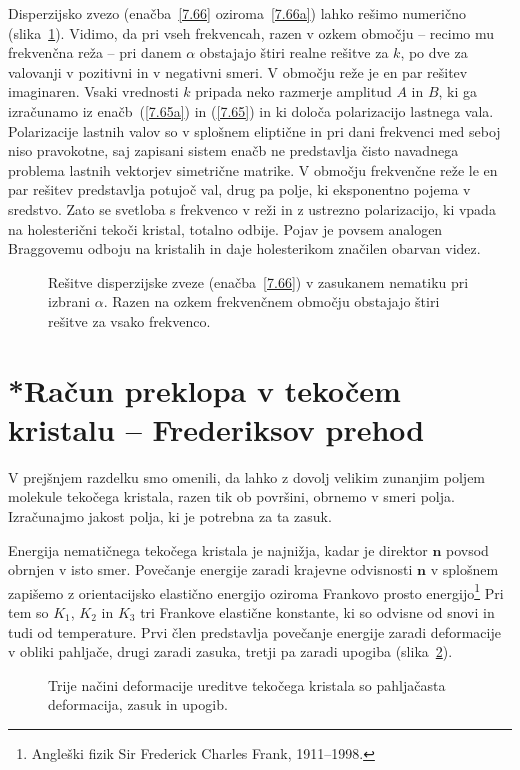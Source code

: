 \begin{remark}
Disperzijsko zvezo (enačba~\ref{7.66} oziroma~\ref{7.66a}) 
lahko rešimo numerično (slika~\ref{gap}). Vidimo, da pri 
vseh frekvencah, razen v ozkem območju -- recimo mu frekvenčna reža --
pri danem $\alpha$ obstajajo štiri realne rešitve za $k$, 
po dve za valovanji v pozitivni in v negativni smeri.
V območju reže je en par rešitev imaginaren. Vsaki vrednosti $k$
pripada neko razmerje amplitud $A$ in $B$, ki ga izračunamo
iz enačb~(\ref{7.65a}) in (\ref{7.65}) in ki določa polarizacijo lastnega vala. Polarizacije
lastnih valov so v splošnem eliptične in pri dani frekvenci med
seboj niso pravokotne, saj zapisani sistem enačb ne predstavlja čisto 
navadnega problema lastnih vektorjev simetrične matrike. 
V območju frekvenčne reže le en par rešitev predstavlja
potujoč val, drug pa polje, ki eksponentno pojema v sredstvo. Zato
se svetloba s frekvenco v reži in z ustrezno polarizacijo, ki vpada
na holesterični tekoči kristal, totalno odbije. Pojav je povsem analogen
Braggovemu odboju na kristalih in daje holesterikom značilen obarvan
videz.
\begin{figure}[h]
\centering
\def\svgwidth{60truemm} 

\caption{Rešitve disperzijske zveze (enačba~\ref{7.66}) v zasukanem nematiku
pri izbrani $\alpha$. Razen na ozkem frekvenčnem območju obstajajo štiri 
rešitve za vsako frekvenco.}
\label{gap}
\end{figure}
\end{remark}

\section{*Račun preklopa v tekočem kristalu -- Frederiksov prehod}
V prejšnjem razdelku smo omenili, da lahko z dovolj velikim zunanjim poljem 
molekule tekočega kristala, razen tik ob površini, obrnemo v smeri polja. 
Izračunajmo jakost polja, ki je potrebna za ta zasuk. 

Energija nematičnega tekočega kristala je najnižja, kadar je direktor $\mathbf{n}$
povsod obrnjen v isto smer. Povečanje energije zaradi krajevne odvisnosti $\mathbf{n}$
v splošnem zapišemo z orientacijsko elastično energijo oziroma Frankovo prosto 
energijo\footnote{Angleški fizik Sir Frederick Charles Frank, 1911--1998.}
Pri tem so $K_{1}$, $K_{2}$ in $K_{3}$ tri Frankove elastične
konstante, ki so odvisne od snovi in tudi od temperature. 
Prvi člen predstavlja povečanje energije zaradi deformacije v obliki 
pahljače, drugi zaradi zasuka, tretji pa zaradi upogiba (slika~\ref{s7.20}).
\begin{figure}[h]
\centering
\def\svgwidth{140truemm} 

\caption{Trije načini deformacije ureditve tekočega kristala so pahljačasta deformacija,
zasuk in upogib.}
\label{s7.20}
\end{figure}

